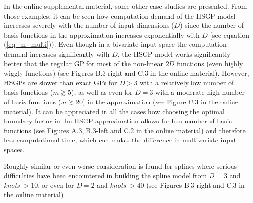 \documentclass[onecolumn,a4paper,11pt]{article}
\begin{document}
{\color{blue}In the online supplemental material, some other case studies are presented. From those examples, it can be seen how computation demand of the HSGP model increases severely with the number of input dimensions ($D$) since the number of basis functions in the approximation increases exponentially with $D$ (see equation (\ref{eq_m_multi})). Even though in a bivariate input space the computation demand increases significantly with $D$, the HSGP model works significantly better that the regular GP for most of the non-linear $2D$ functions (even highly wiggly functions) (see Figures B.3-right and C.3 in the online material). However, HSGPs are slower than exact GPs for $D>3$ with a relatively low number of basis functions ($m \gtrsim 5$), as well as even for $D=3$ with a moderate high number of basis functions ($m \gtrsim 20$) in the approximation (see Figure C.3 in the online material). It can be appreciated in all the cases how choosing the optimal boundary factor in the HSGP approximation allows for less number of basis functions (see Figures A.3, B.3-left and C.2 in the online material) and therefore less computational time, which can makes the difference in multivariate input spaces.


Roughly similar or even worse consideration is found for splines where serious difficulties have been encountered in building the spline model from $D=3$ and \textit{knots} $> 10$, or even for $D=2$ and \textit{knots} $> 40$ (see Figures B.3-right and C.3 in the online material).}
\end{document}
